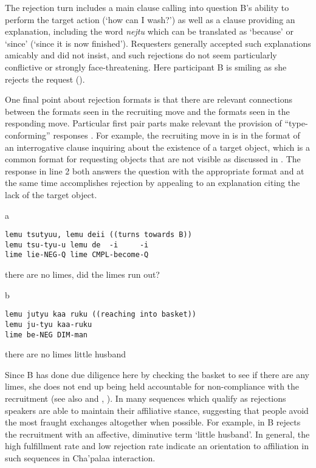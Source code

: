\documentclass[output=paper]{langsci/langscibook}
\begin{document}
\normalsize
The rejection turn includes a main clause calling into question B's ability to perform the target action (‘how can I wash?’) as well as a clause providing an explanation, including the word \textit{nejtu} which can be translated as ‘because’ or ‘since’ (‘since it is now finished’). Requesters generally accepted such explanations amicably and did not insist, and such rejections do not seem particularly conflictive or strongly face-threatening. Here participant B is smiling as she rejects the request ().

One final point about rejection formats is that there are relevant connections between the formats seen in the recruiting move and the formats seen in the responding move. Particular first pair parts make relevant the provision of “type-conforming” responses \citep{Raymond2000,Raymond2003}. For example, the recruiting move in  is in the format of an interrogative clause inquiring about the existence of a target object, which is a common format for requesting objects that are not visible as discussed in . The response in line 2 both answers the question with the appropriate format and at the same time accomplishes rejection by appealing to an explanation citing the lack of the target object.

\vspace{-1mm}
%
\begin{mdframednoverticalspace}[style=firstfoc]
\begin{transbox}{1}{a}
\begin{verbatim}
lemu tsutyuu, lemu deii ((turns towards B))
lemu tsu-tyu-u lemu de  -i     -i
lime lie-NEG-Q lime CMPL-become-Q
\end{verbatim}
there are no limes, did the limes run out?
\end{transbox}
\end{mdframednoverticalspace}
%
\begin{mdframednoverticalspace}[style=secondfoc]
\begin{transbox}{2}{b}
\begin{verbatim}
lemu jutyu kaa ruku ((reaching into basket))
lemu ju-tyu kaa-ruku
lime be-NEG DIM-man
\end{verbatim}
there are no limes little husband
\end{transbox}
\end{mdframednoverticalspace}\bigskip

Since B has done due diligence here by checking the basket to see if there are any limes, she does not end up being held accountable for non-compliance with the recruitment (see also \citealt{Rossi2015b} and , ). In many sequences which qualify as rejections speakers are able to maintain their affiliative stance, suggesting that people avoid the most fraught exchanges altogether when possible. For example, in  B rejects the recruitment with an affective, diminutive term ‘little husband’. In general, the high fulfillment rate and low rejection rate indicate an orientation to affiliation in such sequences in Cha'palaa interaction.
\end{document}
